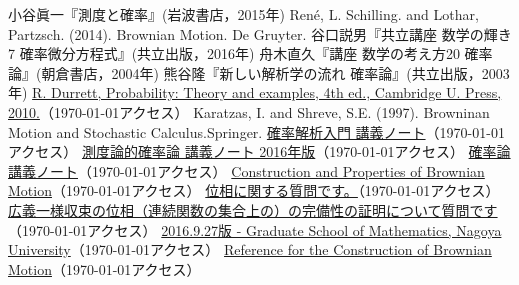 \documentclass[dvipdfmx]{jsarticle}
\begin{document}
\begin{thebibliography}{99}
  小谷眞一『測度と確率』(岩波書店，2015年)
  Ren\'e, L. Schilling. and Lothar, Partzsch. (2014). Brownian Motion. De Gruyter.
  谷口説男『共立講座 数学の輝き7 確率微分方程式』(共立出版，2016年)
  舟木直久『講座 数学の考え方20 確率論』(朝倉書店，2004年)
  熊谷隆『新しい解析学の流れ 確率論』(共立出版，2003年)
  \href{https://services.math.duke.edu/~rtd/PTE/PTE4_1.pdf}{R. Durrett, Probability: Theory and examples, 4th ed., Cambridge U. Press, 2010.}（\today アクセス）
  Karatzas, I. and Shreve, S.E. (1997). Browninan Motion and Stochastic Calculus.Springer.
  \href{http://www.math.u-ryukyu.ac.jp/~sugiura/2010/sde10.pdf}{確率解析入門 講義ノート}（\today アクセス）
  \href{https://954a5131-a-62cb3a1a-s-sites.googlegroups.com/site/kkatostat/home/teaching/probability_theory_v6.pdf?attachauth=ANoY7cpFagKWGTBge201LdFnVmON4UdNf0rr05TCIYpVDBP5QXEJFxqD88Agb7rkp29fSc_CiFiXDdMnlmkwxKeHAhxsHuz3pr5YDDTs3q0z8TePZyYUH9pnvEtYSUllDWe3G9-ccviofi1wRQncwqLdm7G3lFA7OuQrOsb8QwjEnGEei-aM5AJuRzeaOnQhlAWYToiDc0wXmrkPP4tFI-g35zCBrzvjktndngW1CSBrACkyEkOn1foD3rD6zjyMesnMTIYddr9_&attredirects=0}{測度論的確率論 講義ノート 2016年版}（\today アクセス）
  \href{http://web.econ.keio.ac.jp/staff/hattori/probab.pdf}{確率論 講義ノート}（\today アクセス）
  \href{http://math.hawaii.edu/home/talks/brady_talk.pdf}{Construction and Properties of Brownian
Motion}（\today アクセス）
  \href{https://detail.chiebukuro.yahoo.co.jp/qa/question_detail/q1048588135}{位相に関する質問です。}（\today アクセス）
  \href{https://detail.chiebukuro.yahoo.co.jp/qa/question_detail/q14128915279}{広義一様収束の位相（連続関数の集合上の）の完備性の証明について質問です}（\today アクセス）
  \href{http://www.math.nagoya-u.ac.jp/~nakamako/Resources/Probability.pdf}{2016.9.27版 - Graduate School of Mathematics, Nagoya University}（\today アクセス）
  \href{https://math.stackexchange.com/questions/936168/reference-for-the-construction-of-brownian-motion}{Reference for the Construction of Brownian Motion}（\today アクセス）
\end{thebibliography}
%
%
%
%
\end{document}
